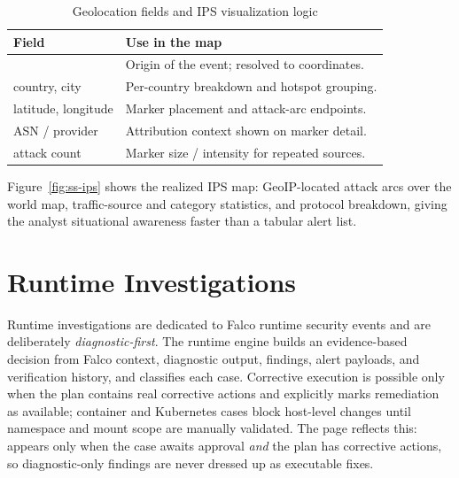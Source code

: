 
\begin{table}[H]
\centering
\caption{Geolocation fields and IPS visualization logic}
\label{tab:ips-fields}
\begin{tabularx}{\textwidth}{@{}p{}Y@{}}
\toprule
\textbf{Field} & \textbf{Use in the map} \\
\midrule
{} & Origin of the event; resolved to coordinates. \\
country, city & Per-country breakdown and hotspot grouping. \\
latitude, longitude & Marker placement and attack-arc endpoints. \\
ASN / provider & Attribution context shown on marker detail. \\
attack count & Marker size / intensity for repeated sources. \\
\bottomrule
\end{tabularx}
\end{table}

Figure~\ref{fig:ss-ips} shows the realized IPS map: GeoIP-located attack arcs over the world map, traffic-source and category statistics, and protocol breakdown, giving the analyst situational awareness faster than a tabular alert list.


\section{Runtime Investigations}

Runtime investigations are dedicated to Falco runtime security events and are deliberately \emph{diagnostic-first}. The runtime engine builds an evidence-based decision from Falco context, diagnostic output, findings, alert payloads, and verification history, and classifies each case. Corrective execution is possible only when the plan contains real corrective actions and explicitly marks remediation as available; container and Kubernetes cases block host-level changes until namespace and mount scope are manually validated. The page reflects this:  appears only when the case awaits approval \emph{and} the plan has corrective actions, so diagnostic-only findings are never dressed up as executable fixes.

